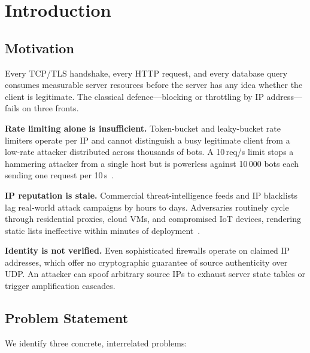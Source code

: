 \documentclass[10pt,conference]{IEEEtran}
\begin{document}
\section{Introduction}
\label{sec:intro}

\subsection{Motivation}

Every TCP/TLS handshake, every HTTP request, and every database query
consumes measurable server resources before the server has any idea
whether the client is legitimate.  The classical defence—blocking or
throttling by IP address—fails on three fronts.

\textbf{Rate limiting alone is insufficient.}  Token-bucket and
leaky-bucket rate limiters operate per IP and cannot distinguish a busy
legitimate client from a low-rate attacker distributed across thousands
of bots.  A 10\,req/s limit stops a hammering attacker from a single
host but is powerless against 10\,000 bots each sending one request per
10\,s~\cite{rfc6585}.

\textbf{IP reputation is stale.}  Commercial threat-intelligence feeds
and IP blacklists lag real-world attack campaigns by hours to days.
Adversaries routinely cycle through residential proxies, cloud VMs, and
compromised IoT devices, rendering static lists ineffective within
minutes of deployment~\cite{mirkovic2004internet}.

\textbf{Identity is not verified.}  Even sophisticated firewalls
operate on claimed IP addresses, which offer no cryptographic guarantee
of source authenticity over UDP.  An attacker can spoof arbitrary
source IPs to exhaust server state tables or trigger amplification
cascades.

\subsection{Problem Statement}

We identify three concrete, interrelated problems:
\end{document}
